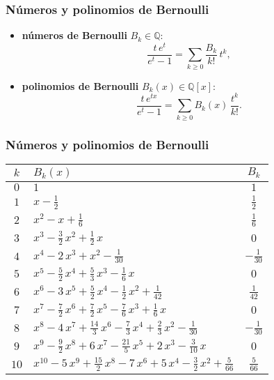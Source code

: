\documentclass[handout]{beamer}
\newcommand{\QQ}{\mathbb{Q}}
\begin{document}
\begin{frame}
  \frametitle{Números y polinomios de Bernoulli}

  \begin{itemize}
  \item<1-> \textbf{números de Bernoulli} $B_k \in \QQ$:
  $$\frac{t\,e^t}{e^t - 1} = \sum_{k\ge 0} \frac{B_k}{k!}\,t^k,$$

  \item<2-> \textbf{polinomios de Bernoulli} $B_k (x) \in \QQ [x]$:
    $$\frac{t\,e^{tx}}{e^t-1} = \sum_{k \ge 0} B_k (x)\,\frac{t^k}{k!}.$$
  \end{itemize}
\end{frame}


\begin{frame}
  \frametitle{Números y polinomios de Bernoulli}

  \begin{center}\small
    \renewcommand{\arraystretch}{1.5}
    \begin{tabular}{clc}
      \hline
      $k$ & $B_k (x)$ & $B_k$ \\
      \hline
      $0$ & $1$ & $1$ \\
      \hline
      $1$ & $x - \frac{1}{2}$ & $\frac{1}{2}$ \\
      \hline
      $2$ & $x^2 - x + \frac{1}{6}$ & $\frac{1}{6}$ \\
      \hline
      $3$ & $x^3 - \frac{3}{2}\,x^2 + \frac{1}{2}\,x$ & $0$ \\
      \hline
      $4$ & $x^4 - 2\,x^3 + x^2 - \frac{1}{30}$ & $-\frac{1}{30}$ \\
      \hline
      $5$ & $x^5 - \frac{5}{2}\,x^4 + \frac{5}{3}\,x^3 - \frac{1}{6}\,x$ & $0$ \\
      \hline
      $6$ & $x^6 - 3\,x^5 + \frac{5}{2}\,x^4 - \frac{1}{2}\,x^2 + \frac{1}{42}$ & $\frac{1}{42}$ \\
      \hline
      $7$ & $x^7 - \frac{7}{2}\,x^6 + \frac{7}{2}\,x^5 - \frac{7}{6}\,x^3 + \frac{1}{6}\,x$ & $0$ \\
      \hline
      $8$ & $x^8 - 4\,x^7 + \frac{14}{3}\,x^6 - \frac{7}{3}\,x^4 + \frac{2}{3}\,x^2 - \frac{1}{30}$ & $-\frac{1}{30}$ \\
      \hline
      $9$ & $x^9 - \frac{9}{2}\,x^8 + 6\,x^7 - \frac{21}{5}\,x^5 + 2\,x^3 - \frac{3}{10}\,x$ & $0$ \\
      \hline
      $10$ & $x^{10} - 5\,x^9 + \frac{15}{2}\,x^8 - 7\,x^6 + 5\,x^4 - \frac{3}{2}\,x^2 + \frac{5}{66}$ & $\frac{5}{66}$ \\
      \hline
    \end{tabular}
  \end{center}
\end{frame}
\end{document}
